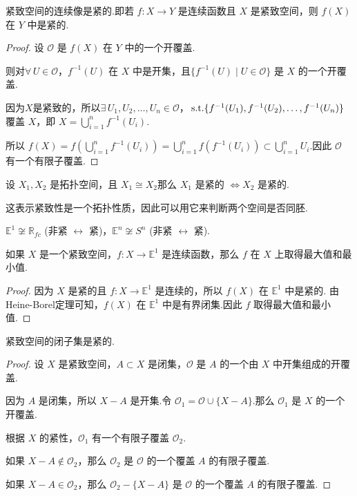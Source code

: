 \begin{proposition}\label{prop:6.1}
    紧致空间的连续像是紧的.即若 $f: X \to Y$ 是连续函数且 $X$ 是紧致空间，则 $f(X)$ 在 $Y$ 中是紧的.
\end{proposition}
\begin{proof}
    设 $\mathcal{O}$ 是 $f(X)$ 在 $Y$ 中的一个开覆盖.\par
    则对$\forall\, U \in \mathcal{O}$，$f^{-1}(U)$ 在 $X$ 中是开集，且$\{f^{-1}(U) \mid U \in \mathcal{O}\}$ 是 $X$ 的一个开覆盖.\par
    因为$X$是紧致的，所以$\exists\, U_1, U_2, \dots, U_n \in \mathcal{O}$，$\operatorname{\,\text{s.t.}} \{f^{-1}(U_1), f^{-1}(U_2), \dots, f^{-1}(U_n)\}$ 覆盖 $X$，即 $X = \bigcup_{i=1}^n f^{-1}(U_i)$.\par
    所以 $f(X) = f\left(\bigcup_{i=1}^n f^{-1}(U_i)\right) = \bigcup_{i=1}^n f(f^{-1}(U_i)) \subset \bigcup_{i=1}^n U_i$.因此 $\mathcal{O}$ 有一个有限子覆盖.
\end{proof}

\begin{corollary}[同胚保持紧性]
    设 $X_1, X_2$ 是拓扑空间，且 $X_1 \cong X_2$那么 $X_1$ 是紧的 $\iff X_2$ 是紧的.
\end{corollary}
这表示紧致性是一个拓扑性质，因此可以用它来判断两个空间是否同胚.

\begin{instance}
    $\mathbb{E}^1 \not\cong \mathbb{R}_{fc}$ (非紧 $\leftrightarrow$ 紧)，$\mathbb{E}^n \not\cong S^n$ (非紧 $\leftrightarrow$ 紧).
\end{instance}

\begin{theorem}[极值定理]
    如果 $X$ 是一个紧致空间，$f: X \to \mathbb{E}^1$ 是连续函数，那么 $f$ 在 $X$ 上取得最大值和最小值.
\end{theorem}
\begin{proof}
    因为 $X$ 是紧的且 $f: X \to \mathbb{E}^1$ 是连续的，所以 $f(X)$ 在 $\mathbb{E}^1$ 中是紧的.
    由Heine-Borel定理可知，$f(X)$ 在 $\mathbb{E}^1$ 中是有界闭集.因此 $f$ 取得最大值和最小值.
\end{proof}

\begin{proposition}\label{prop:6.2}
    紧致空间的闭子集是紧的.
\end{proposition}
\begin{proof}
    设 $X$ 是紧致空间，$A \subset X$ 是闭集，$\mathcal{O}$ 是 $A$ 的一个由 $X$ 中开集组成的开覆盖.\par
    因为 $A$ 是闭集，所以 $X-A$ 是开集.令 $\mathcal{O}_1 = \mathcal{O} \cup \{X-A\}$.那么 $\mathcal{O}_1$ 是 $X$ 的一个开覆盖.\par
    根据 $X$ 的紧性，$\mathcal{O}_1$ 有一个有限子覆盖 $\mathcal{O}_2$.\par
    如果 $X-A \notin \mathcal{O}_2$，那么 $\mathcal{O}_2$ 是 $\mathcal{O}$ 的一个覆盖 $A$ 的有限子覆盖.\par
    如果 $X-A \in \mathcal{O}_2$，那么 $\mathcal{O}_2 - \{X-A\}$ 是 $\mathcal{O}$ 的一个覆盖 $A$ 的有限子覆盖.
\end{proof}

